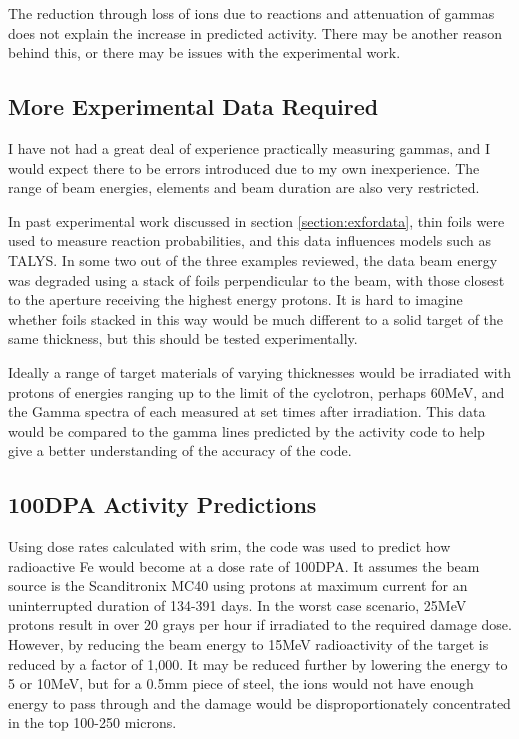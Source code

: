 The reduction through loss of ions due to reactions and attenuation of gammas does not explain the increase in predicted activity.  There may be another reason behind this, or there may be issues with the experimental work.


\subsection{More Experimental Data Required}

I have not had a great deal of experience practically measuring gammas, and I would expect there to be errors introduced due to my own inexperience.  The range of beam energies, elements and beam duration are also very restricted.

In past experimental work discussed in section \ref{section:exfordata}, thin foils were used to measure reaction probabilities, and this data influences models such as TALYS.  In some two out of the three examples reviewed, the data beam energy was degraded using a stack of foils perpendicular to the beam, with those closest to the aperture receiving the highest energy protons.  It is hard to imagine whether foils stacked in this way would be much different to a solid target of the same thickness, but this should be tested experimentally.

Ideally a range of target materials of varying thicknesses would be irradiated with protons of energies ranging up to the limit of the cyclotron, perhaps 60MeV, and the Gamma spectra of each measured at set times after irradiation.  This data would be compared to the gamma lines predicted by the activity code to help give a better understanding of the accuracy of the code.



\subsection{100DPA Activity Predictions}

Using dose rates calculated with \acrshort{srim}, the code was used to predict how radioactive Fe would become at a dose rate of 100DPA.  It assumes the beam source is the Scanditronix MC40 using protons at maximum current for an uninterrupted duration of 134-391 days.  In the worst case scenario, 25MeV protons result in over 20 grays per hour if irradiated to the required damage dose.  However, by reducing the beam energy to 15MeV radioactivity of the target is reduced by a factor of 1,000.  It may be reduced further by lowering the energy to 5 or 10MeV, but for a 0.5mm piece of steel, the ions would not have enough energy to pass through and the damage would be disproportionately concentrated in the top 100-250 microns.

